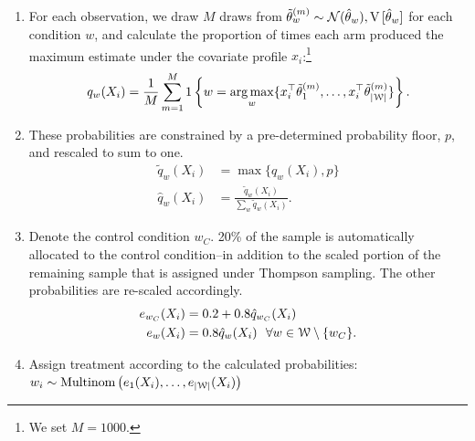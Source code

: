\documentclass[letterpaper, 12pt, parskip=full,]{scrartcl}
\begin{document}
\begin{enumerate}
\begin{enumerate}
 \item For each observation, we draw $M$ draws from $\tilde \theta ^{(m)}_w \sim \mathcal{N}(\hat \theta_w),{\textrm V}\,[\hat\theta_{w}]$ for each condition $w$, and calculate the proportion of times each arm produced the maximum estimate under the covariate profile $x_i$:\footnote{We set $M = 1000$.}
				\begin{align}
    q_w(X_i) = \frac{1}{M} \sum_{m=1}^M 1\left\{ w = \operatorname*{arg\,max}_w \{ x_i^\top \tilde \theta ^{(m)}_1, \dots, x_i^\top\tilde \theta_{|{\EuScript W}|}^{(m)} \}  \right\}.
				\end{align}
\item These probabilities are constrained by a pre-determined probability floor, $p$, and rescaled to sum to one. 
				\begin{align}
     \tilde{q}_w(X_i) & =\max\Biggr\{q_w{(X_i)}, p\Biggr\} \\
     \hat{q}_w(X_i)& = \frac{ \tilde{q}_w(X_i)}{\sum\limits_{w }\tilde{q}_w(X_i) }. 
				\end{align}
\item Denote the control condition $w_{C}$. 20\% of the sample is automatically allocated to the control condition--in addition to the scaled portion of the remaining sample that is assigned under Thompson sampling. The other probabilities are re-scaled accordingly. 
      \begin{align}
         e_{w_C}(X_i) & = 0.2 + 0.8\hat{q}_{w_C}(X_i) \\
          e_{w}(X_i) & = 0.8\hat{q}_w(X_i)\ \ \forall w \in {\EuScript W} \setminus \{w_C\}. 
      \end{align}
\item Assign treatment  according to the calculated probabilities: \\
$w_i \sim \textrm{Multinom} \left( e_{1}(X_i), \dots, e_{|{\EuScript W}|}(X_i)\right)$
\end{enumerate}


\end{enumerate}
\end{document}
